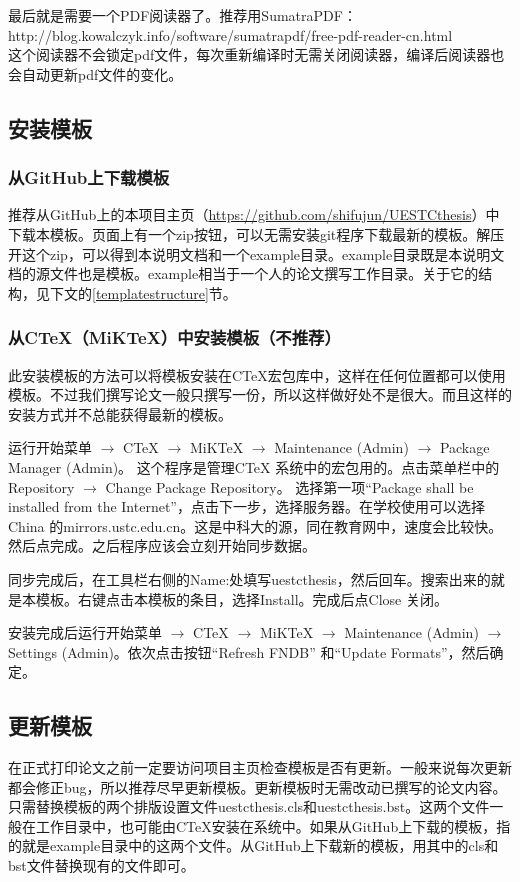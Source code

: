  最后就是需要一个PDF阅读器了。推荐用SumatraPDF：\\
 http://blog.kowalczyk.info/software/sumatrapdf/free-pdf-reader-cn.html\\
 这个阅读器不会锁定pdf文件，每次重新编译时无需关闭阅读器，编译后阅读器也会自动更新pdf文件的变化。
\subsection{安装模板}
\subsubsection{从GitHub上下载模板}
推荐从GitHub上的本项目主页（\url{https://github.com/shifujun/UESTCthesis}）中下载本模板。页面上有一个zip按钮，可以无需安装git程序下载最新的模板。解压开这个zip，可以得到本说明文档和一个example目录。example目录既是本说明文档的源文件也是模板。example相当于一个人的论文撰写工作目录。关于它的结构，见下文的\ref{templatestructure}节。
\subsubsection{从CTeX（MiKTeX）中安装模板（不推荐）}
此安装模板的方法可以将模板安装在CTeX宏包库中，这样在任何位置都可以使用模板。不过我们撰写论文一般只撰写一份，所以这样做好处不是很大。而且这样的安装方式并不总能获得最新的模板。

运行开始菜单 $\longrightarrow$ CTeX $\longrightarrow$ MiKTeX $\longrightarrow$ Maintenance (Admin) $\longrightarrow$ Package Manager (Admin)。 这个程序是管理CTeX 系统中的宏包用的。点击菜单栏中的Repository $\longrightarrow$ Change Package Repository。 选择第一项“Package shall be installed from the Internet”，点击下一步，选择服务器。在学校使用可以选择China 的mirrors.ustc.edu.cn。这是中科大的源，同在教育网中，速度会比较快。然后点完成。之后程序应该会立刻开始同步数据。

同步完成后，在工具栏右侧的Name:处填写uestcthesis，然后回车。搜索出来的就是本模板。右键点击本模板的条目，选择Install。完成后点Close 关闭。

安装完成后运行开始菜单 $\longrightarrow$ CTeX $\longrightarrow$ MiKTeX $\longrightarrow$ Maintenance (Admin) $\longrightarrow$ Settings (Admin)。依次点击按钮“Refresh FNDB” 和“Update Formats”，然后确定。
\subsection{更新模板}
在正式打印论文之前一定要访问项目主页检查模板是否有更新。一般来说每次更新都会修正bug，所以推荐尽早更新模板。更新模板时无需改动已撰写的论文内容。只需替换模板的两个排版设置文件uestcthesis.cls和uestcthesis.bst。这两个文件一般在工作目录中，也可能由CTeX安装在系统中。如果从GitHub上下载的模板，指的就是example目录中的这两个文件。从GitHub上下载新的模板，用其中的cls和bst文件替换现有的文件即可。

